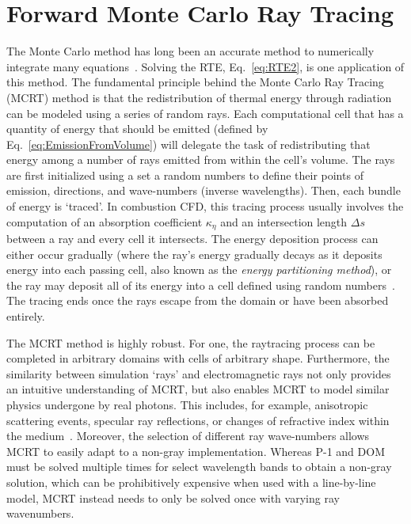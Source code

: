 \section{Forward Monte Carlo Ray Tracing}\label{section:ForwardMC}
The Monte Carlo method has long been an accurate method to numerically integrate many equations~\cite{Howell2021TheTransfer}.
Solving the RTE, Eq.~\ref{eq:RTE2}, is one application of this method. 
The fundamental principle behind the Monte Carlo Ray Tracing (MCRT) method is that the redistribution of thermal energy through radiation can be modeled using a series of random rays. 
Each computational cell that has a quantity of energy that should be emitted (defined by Eq.~\ref{eq:EmissionFromVolume}) will delegate the task of redistributing that energy among a number of rays emitted from within the cell's volume. The rays are first initialized using a set a random numbers to define their points of emission, directions, and wave-numbers (inverse wavelengths).
Then, each bundle of energy is `traced'.
In combustion CFD, this tracing process usually involves the computation of an absorption coefficient $\kappa_\eta$ and an intersection length $\Delta{}s$ between a ray and every cell it intersects.
The energy deposition process can either occur gradually (where the ray's energy gradually decays as it deposits energy into each passing cell, also known as the \textit{energy partitioning method}), or the ray may deposit all of its energy into a cell defined using random numbers~\cite{Modest2022ChapterMediac}.
The tracing ends once the rays escape from the domain or have been absorbed entirely.

The MCRT method is highly robust. For one, the raytracing process can be completed in arbitrary domains with cells of arbitrary shape. Furthermore, the similarity between simulation `rays' and electromagnetic rays not only provides an intuitive understanding of MCRT, but also enables MCRT to model similar physics undergone by real photons. This includes, for example, anisotropic scattering events, specular ray reflections, or changes of refractive index within the medium~\cite{Modest2022ChapterMediac}. Moreover, the selection of different ray wave-numbers allows MCRT to easily adapt to a non-gray implementation. Whereas P-1 and DOM must be solved multiple times for select wavelength bands to obtain a non-gray solution, which can be prohibitively expensive when used with a line-by-line model, MCRT instead needs to only be solved once with varying ray wavenumbers.

